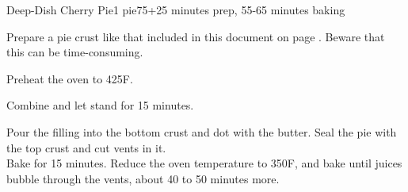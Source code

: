 \documentclass[../Cookbook.tex]{subfiles}
\begin{document}
\begin{recipe}{Deep-Dish Cherry Pie}{1 pie}{75+25 minutes prep, 55-65 minutes baking}

	Prepare a pie crust like that included in this document on page \pageref{PieCrust}. Beware that this can be time-consuming.

	\newstep
	Preheat the oven to 425\0F.

	Combine and let stand for 15 minutes.

	Pour the filling into the bottom crust and dot with the butter. Seal the pie with the top crust and cut vents in it.\\
	Bake for 15 minutes.
	Reduce the oven temperature to 350\0F, and bake until juices bubble through the vents, about 40 to 50 minutes more.

\end{recipe}
\end{document}
